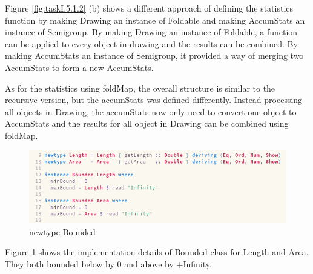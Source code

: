 \documentclass{article}
\begin{document}
\begin{normalsize}
  Figure \ref{fig:taskI.5.1.2} (b) shows a different approach of defining the
  statistics function by making Drawing an instance of Foldable and making
  AccumStats an instance of Semigroup. By making Drawing an instance of
  Foldable, a function can be applied to every object in drawing and the results can be combined. By making AccumStats an instance of Semigroup, it provided a
  way of merging two AccumStats to form a new AccumStats.

  As for the statistics using foldMap, the overall structure is similar to the
  recursive version, but the accumStats was defined differently. Instead
  processing all objects in Drawing, the accumStats now only need to convert one
  object to AccumStats and the results for all object in Drawing can be combined
  using foldMap.

  \begin{figure}[H]
    \centering
    \centerline{\includegraphics[scale=0.4]{StatsBonusBound}}
    \caption{newtype Bounded}
    \label{fig:bounded}
  \end{figure}

  Figure \ref{fig:bounded} shows the implementation details of Bounded class for
  Length and Area. They both bounded below by 0 and above by +Infinity.
  
  \begin{figure}[H]


\end{figure}
\end{normalsize}
\end{document}

